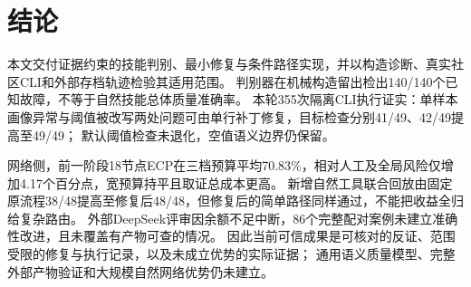 \section{结论}
本文交付证据约束的技能判别、最小修复与条件路径实现，并以构造诊断、真实社区CLI和外部存档轨迹检验其适用范围。
判别器在机械构造留出检出140/140个已知故障，不等于自然技能总体质量准确率。
本轮355次隔离CLI执行证实：单样本画像异常与阈值被改写两处问题可由单行补丁修复，目标检查分别41/49、42/49提高至49/49；
默认阈值检查未退化，空值语义边界仍保留。

网络侧，前一阶段18节点ECP在三档预算平均70.83\%，相对人工及全局风险仅增加4.17个百分点，宽预算持平且取证总成本更高。
新增自然工具联合回放由固定原流程38/48提高至修复后48/48，但修复后的简单路径同样通过，不能把收益全归给复杂路由。
外部DeepSeek评审因余额不足中断，86个完整配对案例未建立准确性改进，且未覆盖有产物可查的情况。
因此当前可信成果是可核对的反证、范围受限的修复与执行记录，以及未成立优势的实际证据；
通用语义质量模型、完整外部产物验证和大规模自然网络优势仍未建立。
